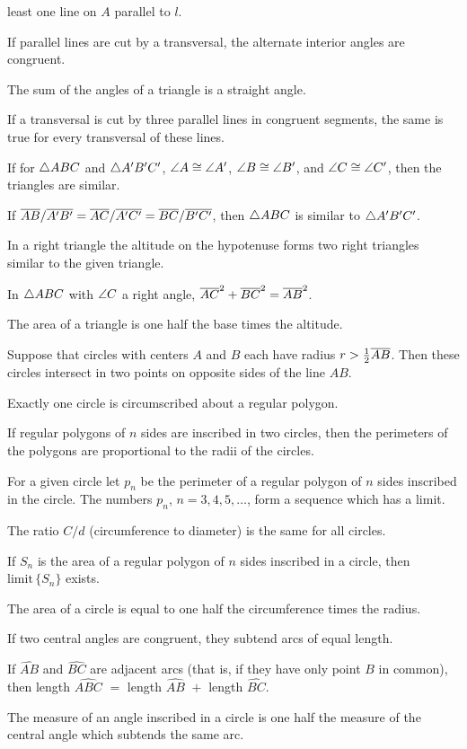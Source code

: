 \documentclass[11pt]{book}
\begin{document}
\begin{applist}
      least one line on $A$ parallel to $l$.
\item If parallel lines are cut by a transversal, the alternate interior
      angles are congruent.
\item The sum of the angles of a triangle is a straight angle.
\item If a transversal is cut by three parallel lines in congruent segments,
      the same is true for every transversal of these lines.
\item If for $\triangle ABC$ and $\triangle A'B'C'$, $\angle A \cong \angle A'$,
      $\angle B \cong \angle B'$, and $\angle C \cong \angle C'$, then the
      triangles are similar.
\item If $\overline{AB}/\overline{A'B'} = \overline{AC}/\overline{A'C'} = \overline{BC}/\overline{B'C'}$, then
      $\triangle ABC$ is similar to $\triangle A'B'C'$.
\item In a right triangle the altitude on the hypotenuse forms two right
      triangles similar to the given triangle.
\item In $\triangle ABC$ with $\angle C$ a right angle,
      $\overline{AC}^2 + \overline{BC}^2 = \overline{AB}^2$.
\item The area of a triangle is one half the base times the altitude.
\item Suppose that circles with centers $A$ and $B$ each have radius
      $r > \frac{1}{2}\overline{AB}$. Then these circles intersect in two points
      on opposite sides of the line $AB$.
\item Exactly one circle is circumscribed about a regular polygon.
\item If regular polygons of $n$ sides are inscribed in two circles, then
      the perimeters of the polygons are proportional to the radii of the
      circles.
\item For a given circle let $p_n$ be the perimeter of a regular polygon of
      $n$ sides inscribed in the circle. The numbers $p_n$,
      $n = 3, 4, 5, \ldots$, form a sequence which has a limit.
\item The ratio $C/d$ (circumference to diameter) is the same for all
      circles.
\item If $S_n$ is the area of a regular polygon of $n$ sides inscribed in a
      circle, then $\mathrm{limit}\, \{S_n\}$ exists.
\item The area of a circle is equal to one half the circumference times the
      radius.
\item If two central angles are congruent, they subtend arcs of equal
      length.
\item If $\widehat{AB}$ and $\widehat{BC}$ are adjacent arcs (that is, if
      they have only point $B$ in common), then length $\widehat{ABC}$
      ${}={}$ length $\widehat{AB}$ ${}+{}$ length $\widehat{BC}$.
\item The measure of an angle inscribed in a circle is one half the measure
      of the central angle which subtends the same arc.
\end{applist}
\end{document}
